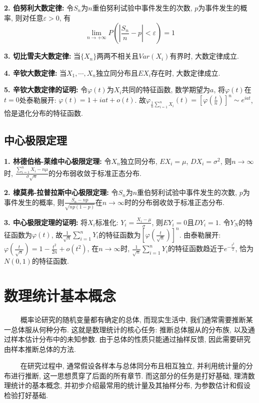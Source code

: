 \textbf{2. 伯努利大数定律: }令$S_n$为$n$重伯努利试验中事件发生的次数, $p$为事件发生的概率, 则对任意$\varepsilon>0$, 有
\begin{equation*}
    \lim\limits_{n\rightarrow +\infty} P\left(\left| \frac{S_n}{n}-p \right|<\varepsilon\right)=1
\end{equation*}

\textbf{3. 切比雪夫大数定律: }当$\{X_n\}$两两不相关且$Var(X_i)$有界时, 大数定律成立.

\textbf{4. 辛钦大数定律: }当$X_1,\cdots,X_n$独立同分布且$EX_i$存在时, 大数定律成立.

\textbf{5. 辛钦大数定律的证明: }令$\varphi(t)$为$X_i$共同的特征函数, 数学期望为$a$, 将$\varphi(t)$在$t=0$处泰勒展开: $\varphi(t)=1+iat+o(t)$. 
故$\varphi_{\frac{1}{n}\sum\limits_{i=1}^n X_i}(t)=\left[\varphi\left(\frac{t}{n}\right)\right]^n \sim e^{iat}$, 恰是退化分布的特征函数.

\subsection{中心极限定理}

\textbf{1. 林德伯格-莱维中心极限定理: }令$X_n$独立同分布, $EX_i=\mu$, $DX_i=\sigma^2$, 则$n\rightarrow \infty$时, $\frac{\sum\limits_{i=1}^n X_i-n\mu}{\sigma\sqrt{n}}$的分布弱收敛于标准正态分布.

\textbf{2. 棣莫弗-拉普拉斯中心极限定理: }令$S_n$为$n$重伯努利试验中事件发生的次数, $p$为事件发生的概率, 则$\frac{S_n-np}{\sqrt{np(1-p)}}$在$n\rightarrow \infty$时的分布弱收敛于标准正态分布.

\textbf{3. 中心极限定理的证明: }将$X_i$标准化: $Y_i=\frac{X_i-\mu}{\sigma}$, 则$EY_i=0$且$DY_i=1$. 令$Y_N$的特征函数为$\varphi(t)$, 故$\frac{1}{\sqrt{n}}\sum\limits_{i=1}^n Y_i$的特征函数为$\left[\varphi\left(\frac{t}{\sqrt{n}}\right)\right]^n$.
由泰勒展开: $\varphi\left(\frac{t}{\sqrt{n}}\right)=1-\frac{t^2}{2n}+o(t^2)$, 在$n\rightarrow \infty $时, $\frac{1}{\sqrt{n}}\sum\limits_{i=1}^n Y_i$的特征函数趋近于$e^{-\frac{t^2}{2}}$, 恰为$N(0,1)$的特征函数.

\section{数理统计基本概念}


\begin{tcolorbox}[colback=red!5,colframe=red!75!black]
    ~~~~ 概率论研究的随机变量都有确定的总体, 而现实生活中, 我们通常需要推断某一总体服从何种分布. 这就是数理统计的核心任务: 推断总体服从的分布族, 以及通过样本估计分布中的未知参数. 
    由于总体的性质只能通过抽样反馈, 因此需要研究由样本推断总体的方法. 

    ~~~~ 在研究过程中, 通常假设各样本与总体同分布且相互独立, 并利用统计量的分布进行推断, 这一思想贯穿了后面的所有章节. 而这部分的任务是打好基础, 理清数理统计的基本概念, 并初步介绍最常用的统计量及其抽样分布, 为参数估计和假设检验打好基础. 
\end{tcolorbox}

